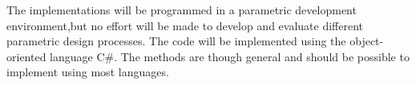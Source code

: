 The implementations will be programmed in a parametric development environment,but no effort will be made to develop and evaluate different parametric design processes. The code will be implemented using the object-oriented language C\#. The methods are though general and should be possible to implement using most languages. 